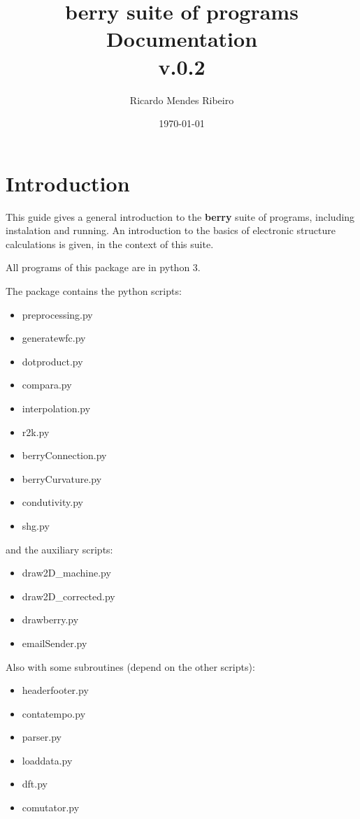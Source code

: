 \documentclass[a4paper,12pt]{report}
\title{{\bf berry} suite of programs\\
\large Documentation \\
v.0.2}
\author{Ricardo Mendes Ribeiro}
\date{\today}
\begin{document}
\maketitle
\tableofcontents

\chapter{Introduction}\label{ch:introduction}

 This guide gives a general introduction to the \textbf{berry} suite of programs, including instalation and running.
 An introduction to the basics of electronic structure calculations is given, in the context of this suite.

 All programs of this package are in python 3.

The package contains the python scripts:
\begin{itemize}
 \item preprocessing.py
 \item generatewfc.py
 \item dotproduct.py
 \item compara.py
 \item interpolation.py
 \item r2k.py
 \item berryConnection.py
 \item berryCurvature.py
 \item condutivity.py
 \item shg.py
\end{itemize}\medskip

and the auxiliary scripts:
\begin{itemize}
 \item draw2D\_machine.py
 \item draw2D\_corrected.py
 \item drawberry.py
 \item emailSender.py
\end{itemize}\medskip

Also with some subroutines (depend on the other scripts):
\begin{itemize}
 \item headerfooter.py
 \item contatempo.py
 \item parser.py
 \item loaddata.py
 \item dft.py
 \item comutator.py
\end{itemize}
\end{document}
